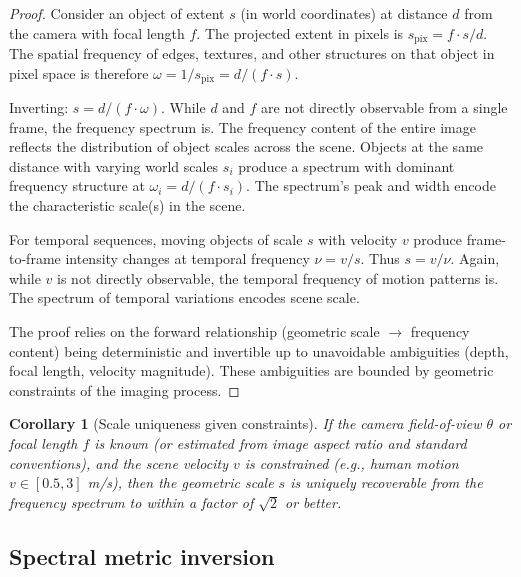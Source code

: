 \documentclass[11pt,twocolumn,a4paper]{article}
\newtheorem{corollary}[theorem]{Corollary}
\theoremstyle{definition}
\begin{document}
\begin{proof}
Consider an object of extent $s$ (in world coordinates) at distance $d$ from the camera with focal length $f$. The projected extent in pixels is $s_{\text{pix}} = f \cdot s / d$. The spatial frequency of edges, textures, and other structures on that object in pixel space is therefore $\omega = 1 / s_{\text{pix}} = d / (f \cdot s)$.

Inverting: $s = d / (f \cdot \omega)$. While $d$ and $f$ are not directly observable from a single frame, the frequency spectrum is. The frequency content of the entire image reflects the distribution of object scales across the scene. Objects at the same distance with varying world scales $s_i$ produce a spectrum with dominant frequency structure at $\omega_i = d / (f \cdot s_i)$. The spectrum's peak and width encode the characteristic scale(s) in the scene.

For temporal sequences, moving objects of scale $s$ with velocity $v$ produce frame-to-frame intensity changes at temporal frequency $\nu = v / s$. Thus $s = v / \nu$. Again, while $v$ is not directly observable, the temporal frequency of motion patterns is. The spectrum of temporal variations encodes scene scale.

The proof relies on the forward relationship (geometric scale $\rightarrow$ frequency content) being deterministic and invertible up to unavoidable ambiguities (depth, focal length, velocity magnitude). These ambiguities are bounded by geometric constraints of the imaging process.
\end{proof}

\begin{corollary}[Scale uniqueness given constraints]
\label{cor:scale_unique}
If the camera field-of-view $\theta$ or focal length $f$ is known (or estimated from image aspect ratio and standard conventions), and the scene velocity $v$ is constrained (e.g., human motion $v \in [0.5, 3]$ m/s), then the geometric scale $s$ is uniquely recoverable from the frequency spectrum to within a factor of $\sqrt{2}$ or better.
\end{corollary}

\subsection{Spectral metric inversion}
\end{document}
